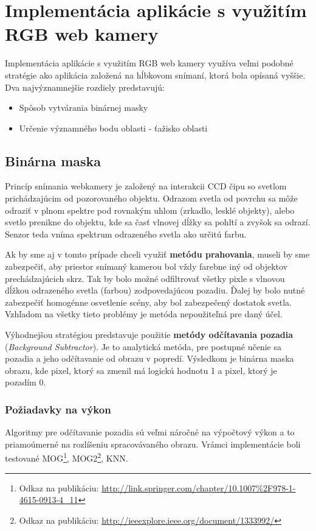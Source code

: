\section{Implementácia aplikácie s využitím RGB web kamery}
Implementácia aplikácie s využitím RGB web kamery využíva veľmi podobné stratégie ako aplikácia založená na hĺbkovom snímaní, ktorá bola opísaná vyššie. Dva najvýznamnejšie rozdiely predstavujú:
\begin{itemize}
\item Spôsob vytvárania binárnej masky
\item Určenie významného bodu oblasti - ťažisko oblasti
\end{itemize}

\subsection{Binárna maska}
Princíp snímania webkamery je založený na interakcii CCD čipu  so svetlom prichádzajúcim od pozorovaného objektu. Odrazom svetla od povrchu sa môže odraziť v plnom spektre pod rovnakým uhlom (zrkadlo, lesklé objekty), alebo svetlo prenikne do objektu, kde sa časť vlnovej dĺžky sa pohltí a zvyšok sa odrazí. Senzor teda vníma spektrum odrazeného svetla ako určitú farbu.

Ak by sme aj v tomto prípade chceli využiť \textbf{metódu prahovania}, museli by sme zabezpečiť, aby priestor snímaný kamerou bol vždy farebne iný od objektov prechádzajúcich skrz. Tak by bolo možné odfiltrovať všetky pixle s vlnovou dĺžkou odrazeného svetla (farbou) zodpovedajúcou pozadiu. Ďalej by bolo nutné zabezpečiť homogénne osvetlenie scény, aby bol zabezpečený dostatok svetla. Vzhľadom na všetky tieto problémy je metóda nepoužiteľná pre daný účel.

Výhodnejšou stratégiou predstavuje použitie \textbf{metódy odčítavania pozadia} (\textit{Background Subtractor}). Je to analytická metóda, pre postupné učenie sa pozadia a jeho odčítavanie od obrazu v popredí. Výsledkom je binárna maska obrazu, kde pixel, ktorý sa zmenil má logickú hodnotu 1 a pixel, ktorý je pozadím 0. 

\subsubsection{Požiadavky na výkon}
Algoritmy pre odčítavanie pozadia sú veľmi náročné na výpočtový výkon a to priamoúmerné na rozlíšeniu spracovávaného obrazu. Vrámci implementácie boli testované MOG\footnote{Odkaz na publikáciu: \url{http://link.springer.com/chapter/10.1007\%2F978-1-4615-0913-4_11}}, MOG2\footnote{Odkaz na publikáciu: \url{http://ieeexplore.ieee.org/document/1333992/}}, KNN.

